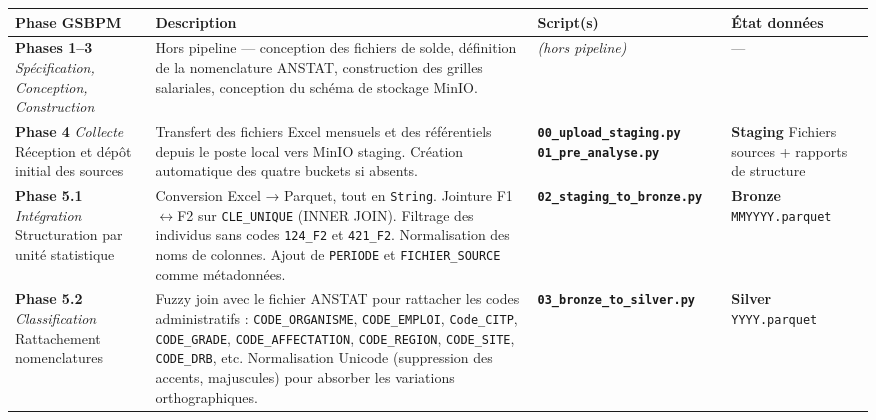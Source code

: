 \documentclass[12pt,a4paper,french]{report}
\newcommand{\scriptname}[1]{\texttt{\textbf{#1}}}
\begin{document}
\begingroup
\small
\begin{longtable}{p{3.2cm} p{5.5cm} p{4cm} p{2cm}}
  \toprule
  \textbf{Phase GSBPM} & \textbf{Description} & \textbf{Script(s)} & \textbf{État données} \\
  \midrule
  \endhead

  \textbf{Phases 1--3}
  \newline \textit{Spécification,}
  \newline \textit{Conception,}
  \newline \textit{Construction}
  &
  Hors pipeline — conception des fichiers de solde, définition de la nomenclature
  ANSTAT, construction des grilles salariales, conception du schéma de stockage MinIO.
  &
  \textit{(hors pipeline)}
  &
  — \\

  \midrule

  \textbf{Phase 4}
  \newline \textit{Collecte}
  \newline \small{Réception et dépôt initial des sources}
  &
  Transfert des fichiers Excel mensuels et des référentiels depuis le poste local
  vers MinIO staging. Création automatique des quatre buckets si absents.
  &
  \scriptname{00\_upload\_staging.py}
  \newline \scriptname{01\_pre\_analyse.py}
  &
  \textbf{Staging}
  \newline Fichiers sources + rapports de structure \\

  \midrule

  \textbf{Phase 5.1}
  \newline \textit{Intégration}
  \newline \small{Structuration par unité statistique}
  &
  Conversion Excel → Parquet, tout en \texttt{String}. Jointure F1$\leftrightarrow$F2
  sur \texttt{CLE\_UNIQUE} (INNER JOIN). Filtrage des individus sans codes
  \texttt{124\_F2} et \texttt{421\_F2}. Normalisation des noms de colonnes.
  Ajout de \texttt{PERIODE} et \texttt{FICHIER\_SOURCE} comme métadonnées.
  &
  \scriptname{02\_staging\_to\_bronze.py}
  &
  \textbf{Bronze}
  \newline \texttt{MMYYYY.parquet} \\

  \midrule

  \textbf{Phase 5.2}
  \newline \textit{Classification}
  \newline \small{Rattachement nomenclatures}
  &
  Fuzzy join avec le fichier ANSTAT pour rattacher les codes administratifs :
  \texttt{CODE\_ORGANISME}, \texttt{CODE\_EMPLOI}, \texttt{Code\_CITP},
  \texttt{CODE\_GRADE}, \texttt{CODE\_AFFECTATION}, \texttt{CODE\_REGION},
  \texttt{CODE\_SITE}, \texttt{CODE\_DRB}, etc. Normalisation Unicode (suppression
  des accents, majuscules) pour absorber les variations orthographiques.
  &
  \scriptname{03\_bronze\_to\_silver.py}
  &
  \textbf{Silver}
  \newline \texttt{YYYY.parquet} \\


\end{longtable}
\end{document}
